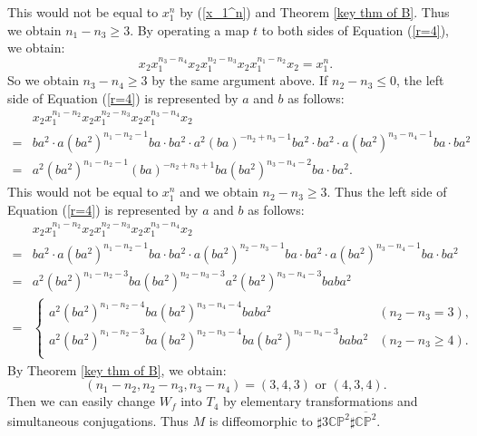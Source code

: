 \documentclass{amsart}
\theoremstyle{plain}
\theoremstyle{definition}
\begin{document}
This would not be equal to $x_1^n$ by (\ref{x_1^n}) and Theorem \ref{key thm of B}. 
Thus we obtain $n_1-n_3\geq 3$. 
By operating a map $t$ to both sides of Equation (\ref{r=4}), we obtain: 
\[
x_2x_1^{n_3-n_4}x_2x_1^{n_2-n_3}x_2x_1^{n_1-n_2}x_2=x_1^n. 
\]
So we obtain $n_3-n_4\geq 3$ by the same argument above. 
If $n_2-n_3\leq 0$, the left side of Equation (\ref{r=4}) is represented by $a$ and $b$ as follows: 
{\allowdisplaybreaks
\begin{align*}
& x_2x_1^{n_1-n_2}x_2x_1^{n_2-n_3}x_2x_1^{n_3-n_4}x_2 \\
= & ba^2\cdot a(ba^2)^{n_1-n_2-1}ba\cdot ba^2\cdot a^2(ba)^{-n_2+n_3-1}ba^2\cdot ba^2 \cdot a(ba^2)^{n_3-n_4-1}ba\cdot ba^2 \\
= & a^2(ba^2)^{n_1-n_2-1}(ba)^{-n_2+n_3+1}ba(ba^2)^{n_3-n_4-2}ba\cdot ba^2. 
\end{align*}
}
This would not be equal to $x_1^n$ and we obtain $n_2-n_3\geq 3$. 
Thus the left side of Equation (\ref{r=4}) is represented by $a$ and $b$ as follows: 
{\allowdisplaybreaks
\begin{align*}
& x_2x_1^{n_1-n_2}x_2x_1^{n_2-n_3}x_2x_1^{n_3-n_4}x_2 \\
= & ba^2\cdot a(ba^2)^{n_1-n_2-1}ba\cdot ba^2\cdot a(ba^2)^{n_2-n_3-1}ba\cdot ba^2 \cdot a(ba^2)^{n_3-n_4-1}ba\cdot ba^2 \\
= & a^2(ba^2)^{n_1-n_2-3}ba(ba^2)^{n_2-n_3-3}a^2(ba^2)^{n_3-n_4-3}baba^2 \\
= & \begin{cases}
a^2(ba^2)^{n_1-n_2-4}ba(ba^2)^{n_3-n_4-4}baba^2 & (n_2-n_3=3), \\
a^2(ba^2)^{n_1-n_2-3}ba(ba^2)^{n_2-n_3-4}ba(ba^2)^{n_3-n_4-3}baba^2 & (n_2-n_3\geq 4). \\
\end{cases}
\end{align*}
}
By Theorem \ref{key thm of B}, we obtain: 
\[
(n_1-n_2,n_2-n_3,n_3-n_4)=(3,4,3)\text{ or }(4,3,4). 
\]
Then we can easily change $W_f$ into $T_4$ by elementary transformations and simultaneous conjugations. 
Thus $M$ is diffeomorphic to $\sharp 3\mathbb{CP}^2\sharp\overline{\mathbb{CP}^2}$. 

\par
\end{document}
